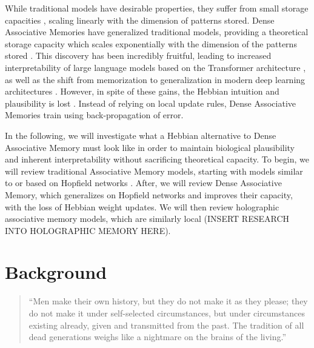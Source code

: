 \documentclass{article}
\theoremstyle{definition}
\begin{document}
While traditional models have desirable properties, they suffer from small
storage capacities \parencites{hopfield_neural_1982,amit_storing_1985},
scaling linearly with the dimension of patterns stored. Dense
Associative Memories have generalized traditional models, providing a
theoretical
storage capacity which scales exponentially with the dimension of the patterns
stored \parencites{krotov_dense_2016,demircigil_model_2017}. This discovery
has been incredibly fruitful, leading to increased interpretability of
large language models based on the Transformer architecture
\parencites{vaswani_attention_2023,ramsauer_hopfield_2021}, as well as the shift
from memorization to generalization in modern deep learning architectures
\parencite{pham_memorization_2025}. However, in spite of these gains,
the Hebbian
intuition and plausibility is lost \parencite{mcalister_sequential_2025}.
Instead of relying on local update rules, Dense Associative Memories
train using back-propagation of error.

In the following, we will investigate what a Hebbian alternative to Dense
Associative Memory must look like in order to maintain biological plausibility
and inherent interpretability without sacrificing theoretical
capacity. To begin,
we will review traditional Associative Memory models, starting with
models similar to or based on Hopfield networks
\parencite{hopfield_neural_1982}.
After, we will review Dense Associative Memory, which generalizes on Hopfield
networks and improves their capacity, with the loss of Hebbian weight updates.
We will then review holographic associative memory models, which are
similarly local (INSERT RESEARCH INTO HOLOGRAPHIC MEMORY HERE).

\section{Background}

\begin{quote}
  ``Men make their own history, but they do not make it as they please; they
  do not make it under self-selected circumstances, but under circumstances
  existing already, given and transmitted from the past. The tradition of all
  dead generations weighs like a nightmare on the brains of the living.''
  \parencite{marx_eighteenth_1852}
\end{quote}
\end{document}
